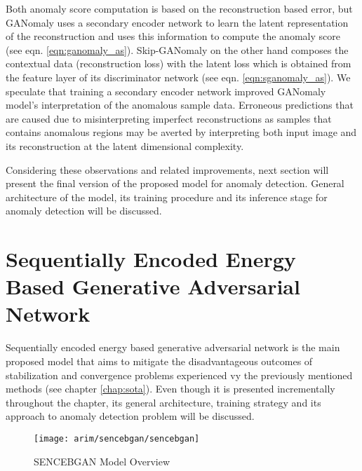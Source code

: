 Both anomaly score computation is based on the reconstruction based error, but GANomaly uses a
secondary encoder network to learn the latent representation of the reconstruction and uses this
information to compute the anomaly score (see eqn. \ref{eqn:ganomaly_as}). Skip-GANomaly on the
other hand composes the contextual data (reconstruction loss) with the latent loss which is obtained
from the feature layer of its discriminator network (see eqn. \ref{eqn:sganomaly_as}). We speculate
that training a secondary encoder network improved GANomaly model's interpretation of the anomalous
sample data. Erroneous predictions that are caused due to misinterpreting imperfect reconstructions
as samples that contains anomalous regions may be averted by interpreting both input image and its
reconstruction at the latent dimensional complexity. 

Considering these observations and related improvements, next section will present the final version
of the proposed model for anomaly detection. General architecture of the model, its training
procedure and its inference stage for anomaly detection will be discussed.

\section{Sequentially Encoded Energy Based Generative Adversarial Network}
\label{sec:sencebgan}

Sequentially encoded energy based generative adversarial network is the main proposed model that
aims to mitigate the disadvantageous outcomes of stabilization and convergence problems experienced
vy the previously mentioned methods (see chapter \ref{chap:sota}). Even though it is presented
incrementally throughout the chapter, its general architecture, training strategy and its approach
to anomaly detection problem will be discussed.
\begin{figure}[h!]
	\centering
	\texttt{[image: arim/sencebgan/sencebgan]}
	\caption{SENCEBGAN Model Overview }
	\label{fig:sencebgan_model}
\end{figure}

